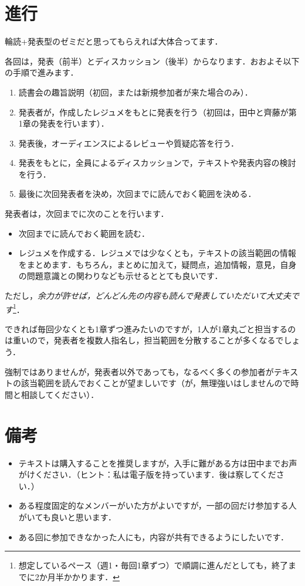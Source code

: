 \documentclass[b5j]{ltjsarticle}
\begin{document}
\section{進行}

輪読+発表型のゼミだと思ってもらえれば大体合ってます．

各回は，発表（前半）とディスカッション（後半）からなります．おおよそ以下の手順で進みます．

\begin{enumerate}
  \item 読書会の趣旨説明（初回，または新規参加者が来た場合のみ）．
  \item 発表者が，作成したレジュメをもとに発表を行う（初回は，田中と⿑藤が第1章の発表を行います）．
  \item 発表後，オーディエンスによるレビューや質疑応答を行う．
  \item 発表をもとに，全員によるディスカッションで，テキストや発表内容の検討を行う．
  \item 最後に次回発表者を決め，次回までに読んでおく範囲を決める．
\end{enumerate}

発表者は，次回までに次のことを行います．

\begin{itemize}
  \item 次回までに読んでおく範囲を読む．
  \item レジュメを作成する．レジュメでは少なくとも，テキストの該当範囲の情報をまとめます．もちろん，まとめに加えて，疑問点，追加情報，意見，自身の問題意識との関わりなども示せるととても良いです．
\end{itemize}
ただし，\emph{余力が許せば，どんどん先の内容も読んで発表していただいて大丈夫です}\footnote{
  想定しているペース（週1・毎回1章ずつ）で順調に進んだとしても，終了までに2か月半かかります．
}．

できれば毎回少なくとも1章ずつ進みたいのですが，1人が1章丸ごと担当するのは重いので，発表者を複数人指名し，担当範囲を分散することが多くなるでしょう．

強制ではありませんが，発表者以外であっても，なるべく多くの参加者がテキストの該当範囲を読んでおくことが望ましいです（が，無理強いはしませんので時間と相談してください）．

\section{備考}
\label{sec_note}

\begin{itemize}
  \item テキストは購入することを推奨しますが，入手に難がある方は田中までお声がけください．（ヒント：私は電子版を持っています．後は察してください．）
  \item ある程度固定的なメンバーがいた方がよいですが，一部の回だけ参加する人がいても良いと思います．
  \item ある回に参加できなかった人にも，内容が共有できるようにしたいです．
\end{itemize}
\end{document}
